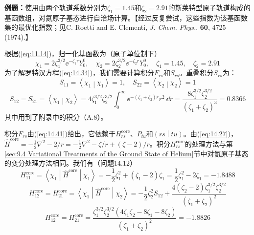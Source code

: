     \begin{examplebox}
        \textbf{例题：}使用由两个轨道系数分别为$\zeta_1 = 1.45$和$\zeta_2 = 2.91$的斯莱特型原子轨道构成的基函数组，对氦原子基态进行自洽场计算。【经过反复尝试，这些指数为该基函数集的最优化指数；见C. Roetti and E. Clementi, \textit{J. Chem. Phys.}, \textbf{60}, 4725 (1974).】

        根据(\ref{eq:11.14})，归一化基函数为（原子单位制下）
        \begin{equation}
            \chi_1 = 2 \zeta_1^{3/2} \ee ^{-\zeta_1 r} Y_0^0, \quad \chi_2 = 2 \zeta_2^{3/2} \ee ^{-\zeta_2 r} Y_0^0, \quad \zeta_1 = 1.45, \quad \zeta_2 = 2.91
            \label{eq:14.46}
        \end{equation}
        为了解罗特汉方程(\ref{eq:14.34})，我们需要计算积分$F_{rs}$和$S_{rs}$。重叠积分$S_{rs}$为：
        \begin{equation*}
            S_{11} = \left\langle \chi_1 \middle| \chi_1 \right\rangle = 1, \quad S_{22} = \left\langle \chi_2 \middle| \chi_2 \right\rangle = 1
        \end{equation*}
        \begin{equation*}
            S_{12} = S_{21} = \left\langle \chi_1 \middle| \chi_2 \right\rangle = 4\zeta_1^{3/2} \zeta_2^{3/2} \int_0^{\infty} \ee ^{-\left(\zeta_1 + \zeta_2\right)r} r^2 \:\dd r = \frac{8\zeta_1^{3/2} \zeta_2^{3/2}}{\left(\zeta_1 + \zeta_2\right)^3} = 0.8366
        \end{equation*}
        其中用到了附录中的积分（A.8）。

        积分$F_{rs}$由(\ref{eq:14.41})给出，它依赖于$H^{\text{core}}_{rs}$、$P_{tu}$和$\left(rs \middle| tu\right)$。由(\ref{eq:14.27})，$\hat{H}^{\text{core}} = -\frac{1}{2} \nabla^2 - {2}/{r} = -\frac{1}{2} \nabla^2 - \zeta / r + \left(\zeta - 2\right)/r$。积分$H^{\text{core}}_{rs}$的处理方法与第\ref{sec:9.4 Variational Treatments of the Ground State of Helium}节中对氦原子基态的变分处理方法相同。我们有（问题14.12）
        \begin{equation*}
            H^{\text{core}}_{11} = \left\langle \chi_1 \middle| \hat{H}^{\text{core}} \middle| \chi_1 \right\rangle = -\frac{1}{2}\zeta_1^2 + \left(\zeta_1 - 2\right) \zeta_1 = \frac{1}{2}\zeta_1^2 - 2\zeta_1 = -1.8488
        \end{equation*}
        \begin{equation*}
            H^{\text{core}}_{12}  = H^{\text{core}}_{21} = \left\langle \chi_1 \middle| \hat{H}^{\text{core}} \middle| \chi_2 \right\rangle = -\frac{1}{2}\zeta_2^2 S_{12} + \frac{4\left(\zeta_2 - 2\right)\zeta_1^{3/2}\zeta_2^{3/2}}{\left(\zeta_1 + \zeta_2\right)^2}
        \end{equation*}
        \begin{equation*}
            H^{\text{core}}_{12} = H^{\text{core}}_{21} = \frac{\zeta_1^{3/2}\zeta_2^{3/2}\left(4\zeta_1\zeta_2 - 8\zeta_1 - 8\zeta_2\right)}{\left(\zeta_1 + \zeta_2\right)^2} = -1.8826
        \end{equation*}


\end{examplebox}
